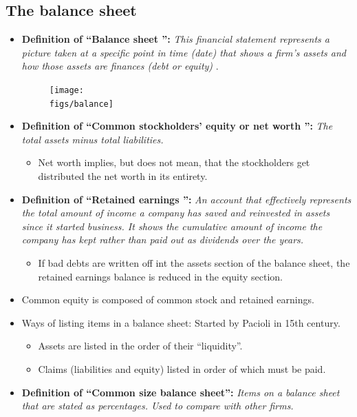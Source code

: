 \documentclass{article}
\renewcommand{\termdefinition}[2]{
    \textbf{Definition of ``#1'':} \emph{#2}
}
\begin{document}
\subsection{The balance sheet}
\begin{itemize}
    \item \termdefinition{Balance sheet }{ This financial statement represents a picture taken at a specific point in time (date) that shows a firm's assets and how those assets are finances (debt or equity)}.
        \begin{figure}[H]
            \centering
            \texttt{[image: \\figs/balance]} 
        \end{figure}

    \item \termdefinition{Common stockholders' equity or net worth }{ The total assets minus total liabilities. } 
        \begin{itemize}
            \item Net worth implies, but does not mean, that the stockholders get distributed the net worth in its entirety. 
        \end{itemize}
    
    \item \termdefinition{Retained earnings }{ An account that effectively represents the total amount of income a company has saved and reinvested in assets since it started business. It shows the cumulative amount of income the company has kept rather than paid out as dividends over the years. } 
        \begin{itemize}
            \item If bad debts are written off int the assets section of the balance sheet, the retained earnings balance is reduced in the equity section. 
        \end{itemize}
    
    \item Common equity is composed of common stock and retained earnings. 
     
    \item Ways of listing items in a balance sheet: Started by Pacioli in 15th century.
        \begin{itemize}
            \item Assets are listed in the order of their ``liquidity''.
            \item Claims (liabilities and equity) listed in order of which must be paid. 
        \end{itemize}
    
    \item \termdefinition{Common size balance sheet}{ Items on a balance sheet that are stated as percentages. Used to compare with other firms.} 
\end{itemize}
\end{document}
